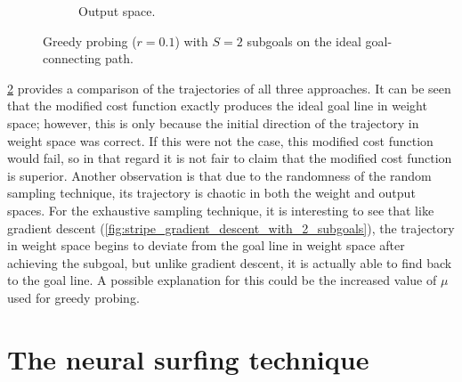 \begin{figure}
\begin{subfigure}{.45\textwidth}
        \caption{Output space.}
        \label{fig:stripe_greedy_probing_with_2_subgoals_output_space}
    \end{subfigure}
    \caption{Greedy probing ($r=0.1$) with $S=2$ subgoals on the ideal goal-connecting path.}
    \label{fig:stripe_greedy_probing_with_2_subgoals}
\end{figure}
\ref{fig:stripe_greedy_probing_with_2_subgoals} provides a comparison of the trajectories of all three approaches.
It can be seen that the modified cost function exactly produces the ideal goal line in weight space; however, this is only because the initial direction of the trajectory in weight space was correct.
If this were not the case, this modified cost function would fail, so in that regard it is not fair to claim that the modified cost function is superior.
Another observation is that due to the randomness of the random sampling technique, its trajectory is chaotic in both the weight and output spaces.
For the exhaustive sampling technique, it is interesting to see that like gradient descent (\ref{fig:stripe_gradient_descent_with_2_subgoals}), the trajectory in weight space begins to deviate from the goal line in weight space after achieving the subgoal, but unlike gradient descent, it is actually able to find back to the goal line. 
A possible explanation for this could be the increased value of $\mu$ used for greedy probing.

\chapter{The neural surfing technique}

